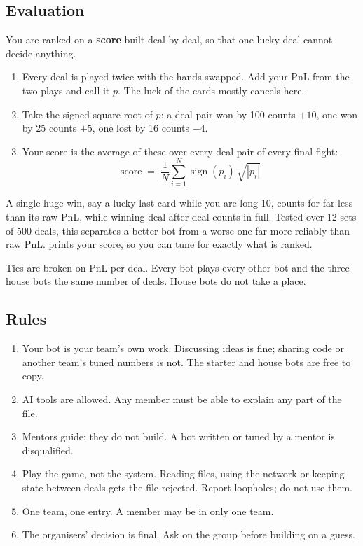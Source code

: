\subsection{Evaluation}

You are ranked on a \textbf{score} built deal by deal, so that one lucky deal cannot decide
anything.

\begin{enumerate}
  \item Every deal is played twice with the hands swapped. Add your PnL from the two plays and
        call it $p$. The luck of the cards mostly cancels here.
  \item Take the signed square root of $p$: a deal pair won by 100 counts $+10$, one won by
        25 counts $+5$, one lost by 16 counts $-4$.
  \item Your score is the average of these over every deal pair of every final fight:
\[
  \text{score} \;=\; \frac{1}{N}\sum_{i=1}^{N} \operatorname{sign}(p_i)\,\sqrt{|p_i|}
\]
\end{enumerate}

A single huge win, say a lucky last card while you are long 10, counts for far less than its
raw PnL, while winning deal after deal counts in full. Tested over 12 sets of 500 deals, this
separates a better bot from a worse one far more reliably than raw PnL. 
prints your score, so you can tune for exactly what is ranked.

Ties are broken on PnL per deal. Every bot plays every other bot and the three house bots the
same number of deals. House bots do not take a place.

\subsection{Rules}

\begin{enumerate}
  \item Your bot is your team's own work. Discussing ideas is fine; sharing code or another
        team's tuned numbers is not. The starter and house bots are free to copy.
  \item AI tools are allowed. Any member must be able to explain any part of the file.
  \item Mentors guide; they do not build. A bot written or tuned by a mentor is disqualified.
  \item Play the game, not the system. Reading files, using the network or keeping state
        between deals gets the file rejected. Report loopholes; do not use them.
  \item One team, one entry. A member may be in only one team.
  \item The organisers' decision is final. Ask on the group before building on a guess.
\end{enumerate}

